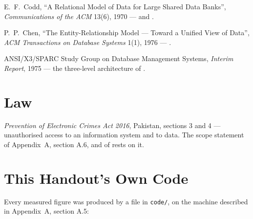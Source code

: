\begin{tight}
  \item E.~F.~Codd, ``A Relational Model of Data for Large Shared Data
        Banks'', \emph{Communications of the ACM} 13(6), 1970 ---
         and .
  \item P.~P.~Chen, ``The Entity-Relationship Model --- Toward a Unified View
        of Data'', \emph{ACM Transactions on Database Systems} 1(1), 1976 ---
        .
  \item ANSI/X3/SPARC Study Group on Database Management Systems,
        \emph{Interim Report}, 1975 --- the three-level architecture of
        .
\end{tight}

\section{Law}

\begin{tight}
  \item \emph{Prevention of Electronic Crimes Act 2016}, Pakistan, sections 3
        and 4 --- unauthorised access to an information system and to data.
        The scope statement of Appendix~A, section A.6, and of 
        rests on it.
\end{tight}

\section{This Handout's Own Code}

Every measured figure was produced by a file in \texttt{code/}, on the machine
described in Appendix~A, section A.5:

